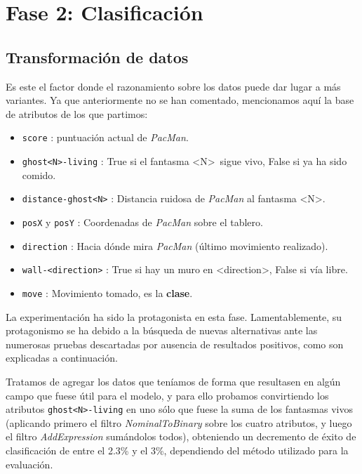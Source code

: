 \documentclass[12pt]{article}
\begin{document}
\newpage
\section{Fase 2: Clasificación}

\subsection{Transformación de datos}

Es este el factor donde el razonamiento sobre los datos puede dar lugar a más variantes. Ya que anteriormente no se han comentado, mencionamos aquí la base de atributos de los que partimos:
\begin{itemize}
    \item \texttt{score} : puntuación actual de \emph{PacMan}.
    \item \texttt{ghost<N>-living} : True si el fantasma \textless N\textgreater\ sigue vivo, False si ya ha sido comido.
    \item \texttt{distance-ghost<N>} : Distancia ruidosa de \emph{PacMan} al fantasma \textless N\textgreater.
    \item \texttt{posX} y \texttt{posY} : Coordenadas de \emph{PacMan} sobre el tablero.
    \item \texttt{direction} : Hacia dónde mira \emph{PacMan} (último movimiento realizado).
    \item \texttt{wall-<direction>} : True si hay un muro en \textless direction\textgreater, False si vía libre.
    \item \texttt{move} : Movimiento tomado, es la \textbf{clase}.
\end{itemize}

La experimentación ha sido la protagonista en esta fase. Lamentablemente, su protagonismo se ha debido a la búsqueda de nuevas alternativas ante las numerosas pruebas descartadas por ausencia de resultados positivos, como son explicadas a continuación.

\vspace{0.2cm}

Tratamos de agregar los datos que teníamos de forma que resultasen en algún campo que fuese útil para el modelo, y para ello probamos convirtiendo los atributos \texttt{ghost<N>-living} en uno sólo que fuese la suma de los fantasmas vivos (aplicando primero el filtro \emph{NominalToBinary} sobre los cuatro atributos, y luego el filtro \emph{AddExpression} sumándolos todos), obteniendo un decremento de éxito de clasificación de entre el 2.3\% y el 3\%, dependiendo del método utilizado para la evaluación.
\end{document}
